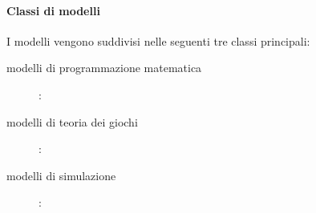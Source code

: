 \documentclass{article}
\begin{document}
        \paragraph{Classi di modelli}
            I modelli vengono suddivisi nelle seguenti tre classi principali:
            \begin{description}
                \item [modelli di programmazione matematica]:
                \item [modelli di teoria dei giochi]:
                \item [modelli di simulazione]:
                \end{description}
\end{document}
